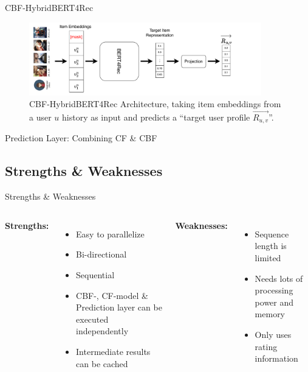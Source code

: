 \documentclass[en]{sdqbeamer}
\begin{document}
\begin{frame}{CBF-HybridBERT4Rec}
	\begin{figure}
		\includegraphics[width=0.9\textwidth]{images/CBF-HybridBERT4Rec.pdf}
		\caption{CBF-HybridBERT4Rec Architecture, taking item embeddings from a user $u$ history as input and predicts a \enquote{target user profile $\overrightarrow{R_{u,v}}$}. \cite{channarongHybridBERT4RecHybridContentBased2022}}
	\end{figure}
\end{frame}
\begin{frame}{Prediction Layer: Combining CF \& CBF}
	
\end{frame}

\subsection{Strengths \& Weaknesses}
\begin{frame}{Strengths \& Weaknesses}
	\begin{columns}
		\large{\textbf{Strengths:}}
		\begin{itemize}
			\item Easy to parallelize
			\item Bi-directional
			\item Sequential
			\item CBF-, CF-model \& Prediction layer can be executed independently
			\item Intermediate results can be cached
		\end{itemize}
		\large{\textbf{Weaknesses:}}
		\begin{itemize}
			\item Sequence length is limited
			\item Needs lots of processing power and memory
			\item Only uses rating information
		\end{itemize}
	\end{columns}
\end{frame}
\end{document}
